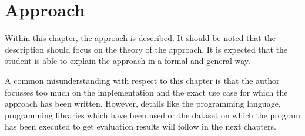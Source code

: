\chapter{Approach}
\label{ch:approach}

Within this chapter, the approach is described. It should be noted that the description should focus on the theory of the approach. It is expected that the student is able to explain the approach in a formal and general way.

A common misunderstanding with respect to this chapter is that the author focusses too much on the implementation and the exact use case for which the approach has been written. However, details like the programming language, programming libraries which have been used or the dataset on which the program has been executed to get evaluation results will follow in the next chapters.